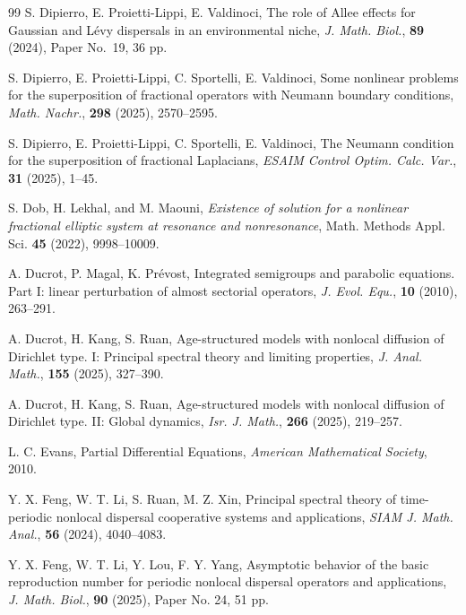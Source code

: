 \documentclass[a4paper,11pt]{amsart}
\theoremstyle{definition}
\numberwithin{equation}{section}
\theoremstyle{definition}
\begin{document}
\begin{thebibliography}{99}
S. Dipierro, E. Proietti-Lippi, E. Valdinoci, 
The role of Allee effects for Gaussian and Lévy dispersals in an environmental niche, 
\textit{J. Math. Biol.}, \textbf{89} (2024), Paper No.~19, 36 pp. 


S. Dipierro, E. Proietti-Lippi, C. Sportelli, E. Valdinoci, 
Some nonlinear problems for the superposition of fractional operators with Neumann boundary conditions, 
\textit{Math. Nachr.}, \textbf{298} (2025), 2570--2595. 

S. Dipierro, E. Proietti-Lippi, C. Sportelli, E. Valdinoci, 
The Neumann condition for the superposition of fractional Laplacians, 
\textit{ESAIM Control Optim. Calc. Var.}, \textbf{31} (2025), 1--45.


S. Dob, H. Lekhal, and M. Maouni,
{\it Existence of solution for a nonlinear fractional elliptic system at resonance and nonresonance},
Math. Methods Appl. Sci. {\bf 45} (2022), 9998--10009.

A. Ducrot, P. Magal, K. Prévost, 
Integrated semigroups and parabolic equations. Part I: linear perturbation of almost sectorial operators, 
\textit{J. Evol. Equ.}, \textbf{10} (2010), 263--291. 


A. Ducrot, H. Kang, S. Ruan, 
Age-structured models with nonlocal diffusion of Dirichlet type. I: Principal spectral theory and limiting properties, 
\textit{J. Anal. Math.}, \textbf{155} (2025), 327--390.

A. Ducrot, H. Kang, S. Ruan, 
Age-structured models with nonlocal diffusion of Dirichlet type. II: Global dynamics, 
\textit{Isr. J. Math.}, \textbf{266} (2025), 219--257.



L. C. Evans, 
Partial Differential Equations, 
\textit{American Mathematical Society}, 2010.

Y. X. Feng, W. T. Li, S. Ruan, M. Z. Xin, 
Principal spectral theory of time-periodic nonlocal dispersal cooperative systems and applications, 
\textit{SIAM J. Math. Anal.}, \textbf{56} (2024), 4040--4083.

Y. X. Feng, W. T. Li, Y. Lou, F. Y. Yang, 
Asymptotic behavior of the basic reproduction number for periodic nonlocal dispersal operators and applications, 
\textit{J. Math. Biol.}, \textbf{90} (2025), Paper No. 24, 51 pp.


\end{thebibliography}
\end{document}
